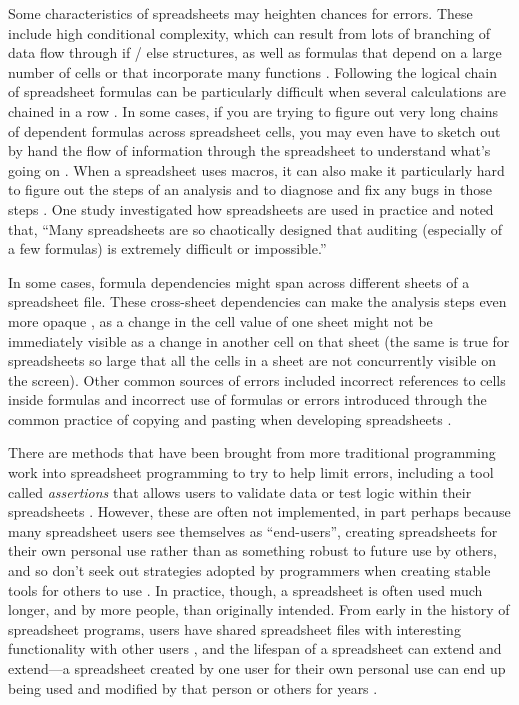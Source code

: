\documentclass[]{tufte-book}
\begin{document}
Some characteristics of spreadsheets may heighten chances for errors. These
include high conditional complexity, which can result from lots of branching of
data flow through if / else structures, as well as formulas that depend on a
large number of cells or that incorporate many functions
\citep{hermans2016spreadsheets}. Following the logical chain of spreadsheet formulas
can be particularly difficult when several calculations are chained in a row
\citep{hermans2015enron}. In some cases, if you are trying to figure out very long
chains of dependent formulas across spreadsheet cells, you may even have to
sketch out by hand the flow of information through the spreadsheet to understand
what's going on \citep{nardi1990spreadsheet}. When a spreadsheet uses macros, it can
also make it particularly hard to figure out the steps of an analysis and to
diagnose and fix any bugs in those steps \citep{nash2006spreadsheets, creeth1985microcomputer}. One study investigated how spreadsheets are used in
practice and noted that, ``Many spreadsheets are so chaotically designed that
auditing (especially of a few formulas) is extremely difficult or impossible.''
\citep{powell2009errors}

In some cases, formula dependencies might span across different sheets of a
spreadsheet file. These cross-sheet dependencies can make the analysis steps
even more opaque \citep{hermans2016spreadsheets}, as a change in the cell value of
one sheet might not be immediately visible as a change in another cell on that
sheet (the same is true for spreadsheets so large that all the cells in a sheet
are not concurrently visible on the screen). Other common sources of errors
included incorrect references to cells inside formulas and incorrect use of
formulas \citep{powell2009errors} or errors introduced through the common practice of
copying and pasting when developing spreadsheets \citep{hermans2016spreadsheets}.

There are methods that have been brought from more traditional programming work
into spreadsheet programming to try to help limit errors, including a tool
called \emph{assertions} that allows users to validate data or test logic within their
spreadsheets \citep{hermans2016spreadsheets}. However, these are often not
implemented, in part perhaps because many spreadsheet users see themselves as
``end-users'', creating spreadsheets for their own personal use rather than as
something robust to future use by others, and so don't seek out strategies
adopted by programmers when creating stable tools for others to use
\citep{hermans2016spreadsheets}. In practice, though, a spreadsheet is often used
much longer, and by more people, than originally intended. From early in the
history of spreadsheet programs, users have shared spreadsheet files with
interesting functionality with other users \citep{levy1984spreadsheet}, and the
lifespan of a spreadsheet can extend and extend---a spreadsheet created by one
user for their own personal use can end up being used and modified by that
person or others for years \citep{hermans2016spreadsheets}.
\end{document}
